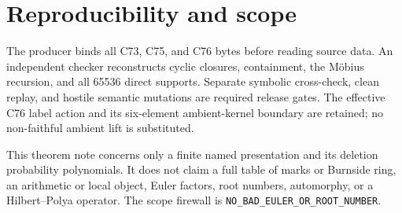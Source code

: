 \documentclass[10pt]{article}
\begin{document}
\section{Reproducibility and scope}
The producer binds all C73, C75, and C76 bytes before reading source data.  An independent
checker reconstructs cyclic closures, containment, the Möbius recursion, and
all 65536 direct supports.  Separate symbolic cross-check, clean replay, and
hostile semantic mutations are required release gates.  The effective C76
label action and its six-element ambient-kernel boundary are retained; no
non-faithful ambient lift is substituted.

This theorem note concerns only a finite named presentation and its deletion
probability polynomials.  It does not claim a full table of marks or Burnside
ring, an arithmetic or local object, Euler factors, root numbers, automorphy,
or a Hilbert--Polya operator.  The scope firewall is
\texttt{NO\_BAD\_EULER\_OR\_ROOT\_NUMBER}.
\end{document}
